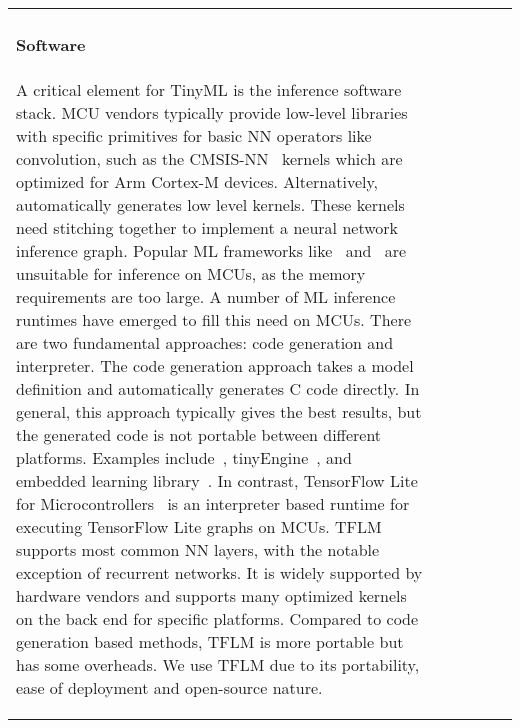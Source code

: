 \documentclass{article}
\begin{document}
\begin{table}[t]
\begin{tabular}{l| c | c | c | c | c}
\paragraph{Software}
A critical element for TinyML is the inference software stack. 
MCU vendors typically provide low-level libraries with specific primitives for basic NN operators like convolution, such as the CMSIS-NN~\cite{lai2018cmsis} kernels which are optimized for Arm Cortex-M devices. 
Alternatively,~\citealt{micro-tvm} automatically generates low level kernels. 
These kernels need stitching together to implement a neural network inference graph.
Popular ML frameworks like~\citealt{tensorflow} and~\citealt{pytorch} are unsuitable for inference on MCUs, as the memory requirements are too large.
A number of ML inference runtimes have emerged to fill this need on MCUs.
There are two fundamental approaches: code generation and interpreter. 
The code generation approach takes a model definition and automatically generates C code directly. 
In general, this approach typically gives the best results, but the generated code is not portable between different platforms.
Examples include~\citealt{utensor}, tinyEngine~\cite{lin2020mcunet}, and embedded learning library~\cite{ell}.
In contrast, TensorFlow Lite for Microcontrollers~\citealt{TFLM} is an interpreter based runtime for executing TensorFlow Lite graphs on MCUs. 
TFLM supports most common NN layers, with the notable exception of recurrent networks. 
It is widely supported by hardware vendors and supports many optimized kernels on the back end for specific platforms. 
Compared to code generation based methods, TFLM is more portable but has some overheads. 
We use TFLM due to its portability, ease of deployment and open-source nature.




\end{tabular}
\end{table}
\end{document}
